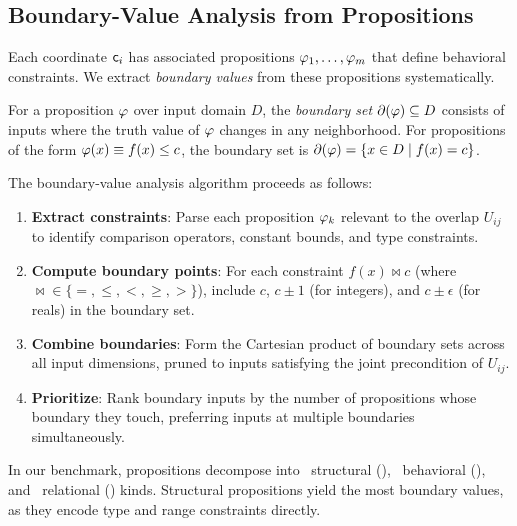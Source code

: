 \documentclass[11pt]{article}
\begin{document}
\subsection{Boundary-Value Analysis from Propositions}\label{sec:boundary-analysis}

Each coordinate $\mathsf{c}_i$ has associated propositions
$\varphi_1, \ldots, \varphi_m$ that define behavioral constraints.  We extract
\emph{boundary values} from these propositions systematically.

\begin{definition}\label{def:prop-boundary}
For a proposition $\varphi$ over input domain $D$, the \emph{boundary set}
$\partial(\varphi) \subseteq D$ consists of inputs where the truth value
of $\varphi$ changes in any neighborhood.  For propositions of the form
$\varphi(x) \equiv f(x) \leq c$, the boundary set is
$\partial(\varphi) = \{x \in D \mid f(x) = c\}$.
\end{definition}

The boundary-value analysis algorithm proceeds as follows:

\begin{enumerate}[noitemsep]
  \item \textbf{Extract constraints}: Parse each proposition $\varphi_k$
        relevant to the overlap $U_{ij}$ to identify comparison operators,
        constant bounds, and type constraints.
  \item \textbf{Compute boundary points}: For each constraint
        $f(x) \bowtie c$ (where ${\bowtie} \in \{=, \leq, <, \geq, >\}$),
        include $c$, $c \pm 1$ (for integers), and $c \pm \epsilon$ (for
        reals) in the boundary set.
  \item \textbf{Combine boundaries}: Form the Cartesian product of
        boundary sets across all input dimensions, pruned to inputs
        satisfying the joint precondition of $U_{ij}$.
  \item \textbf{Prioritize}: Rank boundary inputs by the number of
        propositions whose boundary they touch, preferring inputs at
        multiple boundaries simultaneously.
\end{enumerate}

In our benchmark, propositions decompose into \suppPropStructuralCount\
structural (\suppPropStructuralPct), \suppPropBehavioralCount\ behavioral
(\suppPropBehavioralPct), and \suppPropRelationalCount\ relational
(\suppPropRelationalPct) kinds.  Structural propositions yield the
most boundary values, as they encode type and range constraints directly.
\end{document}

